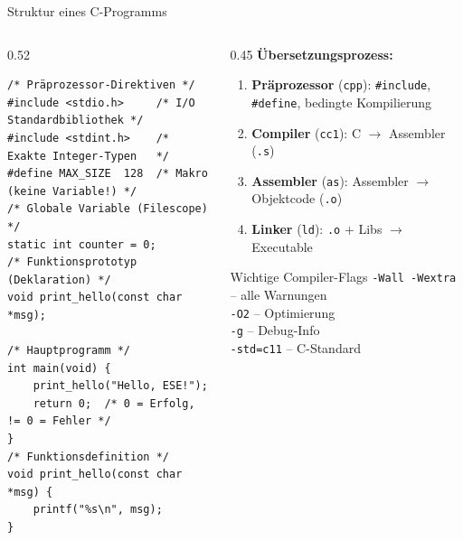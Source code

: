 \documentclass[%
  aspectratio=169,
  10pt
]{beamer}
\begin{document}
\begin{frame}[fragile]{Struktur eines C-Programms}
  \begin{columns}[T]
    \begin{column}{0.52\textwidth}
\begin{lstlisting}
/* Präprozessor-Direktiven */
#include <stdio.h>     /* I/O Standardbibliothek */
#include <stdint.h>    /* Exakte Integer-Typen   */
#define MAX_SIZE  128  /* Makro (keine Variable!) */
/* Globale Variable (Filescope) */
static int counter = 0;
/* Funktionsprototyp (Deklaration) */
void print_hello(const char *msg);

/* Hauptprogramm */
int main(void) {
    print_hello("Hello, ESE!");
    return 0;  /* 0 = Erfolg, != 0 = Fehler */
}
/* Funktionsdefinition */
void print_hello(const char *msg) {
    printf("%s\n", msg);
}
\end{lstlisting}
    \end{column}
    \begin{column}{0.45\textwidth}
      \textbf{Übersetzungsprozess:}
      \begin{enumerate}
        \item \textbf{Präprozessor} (\texttt{cpp}):
              \texttt{\#include}, \texttt{\#define}, bedingte
              Kompilierung
        \item \textbf{Compiler} (\texttt{cc1}):
              C $\rightarrow$ Assembler (\texttt{.s})
        \item \textbf{Assembler} (\texttt{as}):
              Assembler $\rightarrow$ Objektcode (\texttt{.o})
        \item \textbf{Linker} (\texttt{ld}):
              \texttt{.o} + Libs $\rightarrow$ Executable
      \end{enumerate}
      \vspace{0.3em}
      \begin{block}{Wichtige Compiler-Flags}
        \texttt{-Wall -Wextra} -- alle Warnungen\\
        \texttt{-O2} -- Optimierung\\
        \texttt{-g} -- Debug-Info\\
        \texttt{-std=c11} -- C-Standard
      \end{block}
    \end{column}
  \end{columns}
\end{frame}
\end{document}
